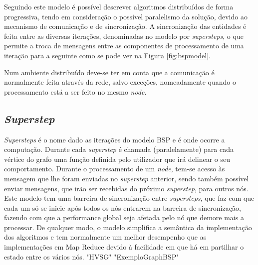 Seguindo este modelo é possível descrever algoritmos distribuídos de forma 
progressiva, tendo em consideração o possível paralelismo da solução, devido ao 
mecanismo de comunicação e de sincronização. A sincronização das entidades é  
feita entre as diversas iterações, denominadas no modelo por 
\textit{supersteps}, o que permite a troca de mensagens entre as componentes de 
processamento de uma iteração para a seguinte como se pode ver na Figura 
\ref{fig:bspmodel}.

Num ambiente distribuído deve-se ter em conta que a comunicação é normalmente 
feita através da rede, salvo exceções, nomeadamente quando o processamento 
está a ser feito no mesmo \textit{node}.

\subsection{\textit{Superstep}}
\textit{Supersteps} é o nome dado as iterações do modelo BSP e é onde ocorre a computação.
Durante cada \textit{superstep} é chamada (paralelamente) para cada vértice do grafo uma função definida pelo utilizador que irá delinear o seu comportamento.
Durante o processamento de um \textit{node}, tem-se acesso às mensagem que lhe foram enviadas no \textit{superstep} anterior, sendo também possível enviar mensagens, que irão ser recebidas do próximo \textit{superstep}, para outros nós.
Este modelo tem uma barreira de sincronização entre \textit{supersteps}, que faz com que cada um só se inicie após todos os nós entrarem na barreira de sincronização, fazendo com que a performance global seja afetada pelo nó que demore mais a processar.
De qualquer modo, o modelo simplifica a semântica da implementação dos algoritmos e tem normalmente um melhor desempenho que as implementações em Map Reduce devido à facilidade em que há em partilhar o estado entre os vários nós.
{"HVSG"}
{"ExemploGraphBSP"}